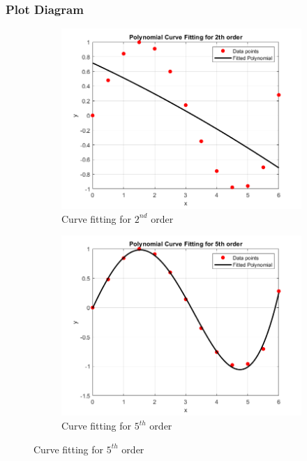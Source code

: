 \documentclass[a4paper,12pt]{article}
\begin{document}
	\subsubsection{Plot Diagram}
\begin{figure}[H]
	\centering
	\begin{subfigure}[t]{0.49\textwidth}
		\centering
		\includegraphics[width=1.1\linewidth]{Images/2}
		\caption{Curve fitting for $2^{nd}$ order}
		\vspace{0.1cm}
	\end{subfigure}
	\hfil
	\begin{subfigure}[t]{0.49\textwidth}
		\centering
		\includegraphics[width=1.1\linewidth]{Images/5}
		\caption{Curve fitting for $5^{th}$ order}
	\end{subfigure}
	

\end{figure}
\end{document}
